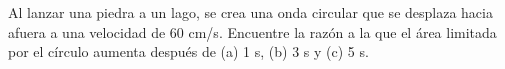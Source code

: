 \item Al lanzar una piedra a un lago, se crea una onda circular que se desplaza hacia afuera a una velocidad de 60 cm/s. Encuentre la razón a la que el área limitada por el círculo aumenta después de (a) 1 s, (b) 3 s y (c) 5 s.

